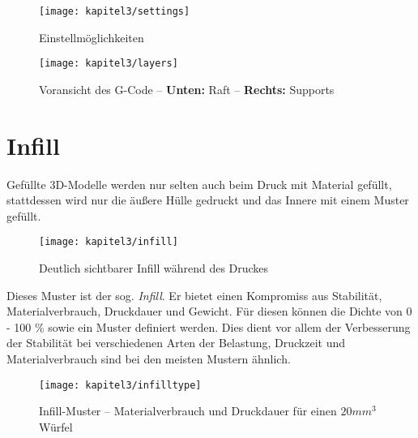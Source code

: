 \begin{figure}[h]
  \centering
  \texttt{[image: kapitel3/settings]}
  \caption{Einstellmöglichkeiten}
  \label{Kap3:Settings}
\end{figure}

\begin{figure}[h]
  \centering
  \texttt{[image: kapitel3/layers]}
  \caption{Voransicht des G-Code -- \textbf{Unten:} Raft -- \textbf{Rechts:} Supports}
  \label{Kap3:Preview}
\end{figure}

\section{Infill}
Gefüllte 3D-Modelle werden nur selten auch beim Druck mit Material gefüllt, stattdessen wird nur die äußere Hülle gedruckt und das Innere mit einem Muster gefüllt.

\begin{figure}[h]
  \centering
  \texttt{[image: kapitel3/infill]}
  \caption{Deutlich sichtbarer Infill während des Druckes}
  \label{Kap3:Infill}
\end{figure}

Dieses Muster ist der sog. \textit{Infill}. Er bietet einen Kompromiss aus Stabilität, Materialverbrauch, Druckdauer und Gewicht. Für diesen können die Dichte von 0 - 100 \% sowie ein Muster definiert werden. Dies dient vor allem der Verbesserung der Stabilität bei verschiedenen Arten der Belastung, Druckzeit und Materialverbrauch sind bei den meisten Mustern ähnlich.

\begin{figure}[h]
  \centering
  \texttt{[image: kapitel3/infilltype]}
  \caption{Infill-Muster -- Materialverbrauch und Druckdauer für einen $20mm^3$ Würfel}
  \label{Kap3:Infilltype}
\end{figure}